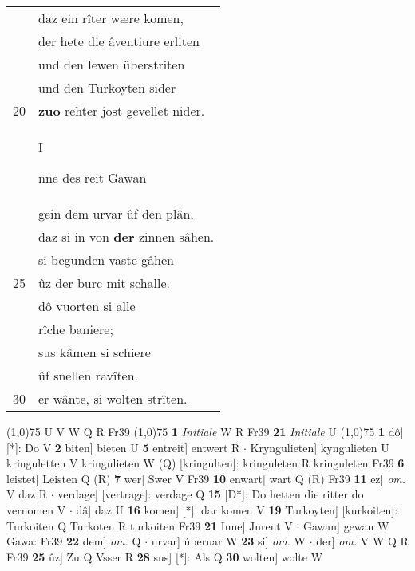 \documentclass[8pt,a4paper,notitlepage]{article}
\begin{document}
\begin{table}[ht]
\begin{minipage}[t]{0.5\linewidth}
\begin{tabular}{rl}
 & daz ein rîter wære komen,\\ 
 & der hete die âventiure erliten\\ 
 & und den lewen überstriten\\ 
 & und den Turkoyten sider\\ 
20 & \textbf{zuo} rehter jost gevellet nider.\\ 
 & \begin{large}I\end{large}nne des reit Gawan\\ 
 & gein dem urvar ûf den plân,\\ 
 & daz si in von \textbf{der} zinnen sâhen.\\ 
 & si begunden vaste gâhen\\ 
25 & ûz der burc mit schalle.\\ 
 & dô vuorten si alle\\ 
 & rîche baniere;\\ 
 & sus kâmen si schiere\\ 
 & ûf snellen ravîten.\\ 
30 & er wânte, si wolten strîten.\\ 
\end{tabular}
\scriptsize
\line(1,0){75} \newline
U V W Q R Fr39 \newline
\line(1,0){75} \newline
\textbf{1} \textit{Initiale} W R Fr39  \textbf{21} \textit{Initiale} U  \newline
\line(1,0){75} \newline
\textbf{1} dô] [*]: Do V \textbf{2} biten] bieten U \textbf{5} entreit] entwert R  $\cdot$ Kryngulieten] kyngulieten U kringuletten V kringulieten W (Q) [kringulten]: kringuleten  R kringuleten Fr39 \textbf{6} leistet] Leisten Q (R) \textbf{7} wer] Swer V Fr39 \textbf{10} enwart] wart Q (R) Fr39 \textbf{11} ez] \textit{om.} V daz R  $\cdot$ verdage] [vertrage]: verdage Q \textbf{15} [D*]: Do hetten die ritter do vernomen V  $\cdot$ dâ] daz U \textbf{16} komen] [*]: dar komen V \textbf{19} Turkoyten] [kurkoiten]: Turkoiten Q Turkoten R turkoiten Fr39 \textbf{21} Inne] Jnrent V  $\cdot$ Gawan] gewan W Gawa: Fr39 \textbf{22} dem] \textit{om.} Q  $\cdot$ urvar] úberuar W \textbf{23} si] \textit{om.} W  $\cdot$ der] \textit{om.} V W Q R Fr39 \textbf{25} ûz] Zu Q Vsser R \textbf{28} sus] [*]: Als Q \textbf{30} wolten] wolte W \newline
\end{minipage}
\end{table}
\end{document}
